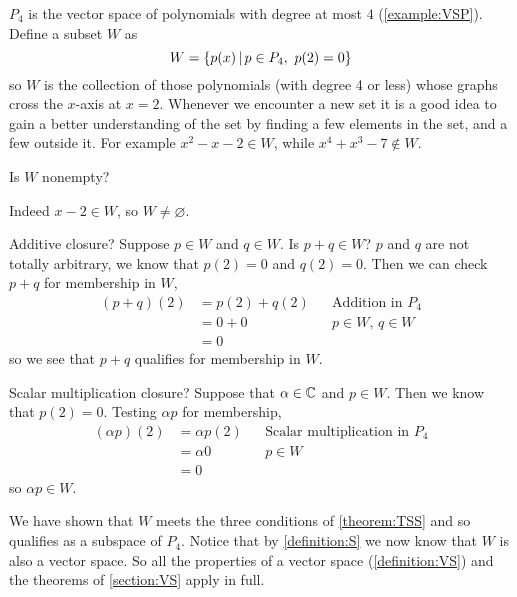 \documentclass{ximera}
\begin{document}
\begin{example}[A subspace of $P_4$]

  $P_4$ is the vector space of polynomials with degree at most $4$ (\ref{example:VSP}).  Define a subset $W$ as
  \[
    W=\setparts{p(x)}{p\in P_4,\ p(2)=0}
  \]
  so $W$ is the collection of those polynomials (with degree 4 or
  less) whose graphs cross the $x$-axis at $x=2$.  Whenever we
  encounter a new set it is a good idea to gain a better understanding
  of the set by finding a few elements in the set, and a few outside
  it.  For example $x^2-x-2\in W$, while $x^4+x^3-7\not\in W$.

  Is $W$ nonempty?  
  \begin{multipleChoice}
  \end{multipleChoice}

  \begin{feedback}[correct]
    Indeed $x-2\in W$, so $W \neq \varnothing$.
  \end{feedback}

  Additive closure?  Suppose $p\in W$ and $q\in W$.  Is $p+q\in W$?
  $p$ and $q$ are not totally arbitrary, we know that $p(2)=0$ and
  $q(2)=0$.  Then we can check $p+q$ for membership in $W$,
  \begin{align*}
    (p+q)(2)&=p(2)+q(2)&&\text{Addition in }P_4\\
            &=0+0&&p\in W,\,q\in W\\
            &=0
  \end{align*}
  so we see that $p+q$ qualifies for membership in $W$.
  
  Scalar multiplication closure?  Suppose that $\alpha\in\mathbb{C}$ and $p\in W$.  Then we know that $p(2)=0$.  Testing $\alpha p$ for membership,
  \begin{align*}
    (\alpha p)(2)&=\alpha p(2)&&\text{Scalar multiplication in }P_4\\
                 &=\alpha 0&&p\in W\\
                 &=0
  \end{align*}
  so $\alpha p\in W$.
  
  We have shown that $W$ meets the three conditions of
  \ref{theorem:TSS} and so qualifies as a subspace of $P_4$.  Notice
  that by \ref{definition:S} we now know that $W$ is also a vector
  space.  So all the properties of a vector space
  (\ref{definition:VS}) and the theorems of \ref{section:VS} apply in
  full.

\end{example}
\end{document}
